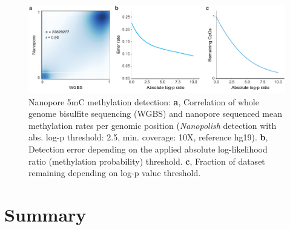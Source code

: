 \begin{figure}[h]
    \centering
    \includegraphics[width=1.0\textwidth]{figures/state_of_art/methylation.pdf}
    \captionsetup{format=plain}
    \caption[Nanopore methylation detection]{Nanopore 5mC methylation detection: \textbf{a}, Correlation of whole genome bisulfite sequencing (WGBS) and nanopore sequenced mean methylation rates per genomic position (\textit{Nanopolish} detection with abs. log-p threshold: 2.5, min. coverage: 10X, reference hg19). \textbf{b}, Detection error depending on the applied absolute log-likelihood ratio (methylation probability) threshold. \textbf{c}, Fraction of dataset remaining depending on log-p value threshold.}
    \label{fig:state_of_art:methylation}
\end{figure}




\section{Summary}
\label{sec:stat_of_art:summary}








